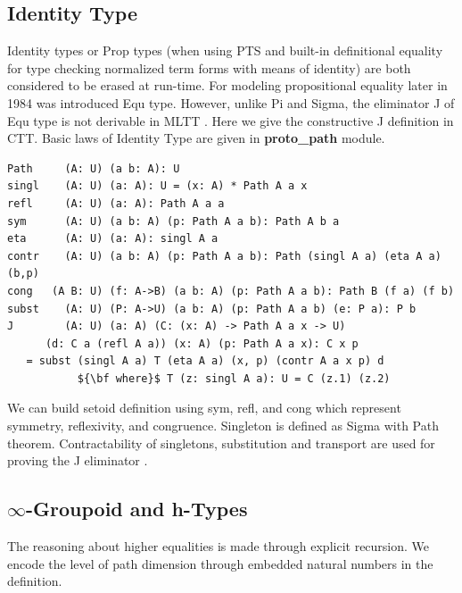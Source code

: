 \documentclass{article}
\begin{document}


\subsection{Identity Type}

Identity types or Prop types (when using PTS and built-in definitional equality for type checking
normalized term forms with means of identity) are both considered to be erased at run-time.
For modeling propositional equality later in 1984 was introduced Equ type. \cite{Lof84}
However, unlike Pi and Sigma, the eliminator J of Equ type is
not derivable in MLTT \cite{Hofmann96, Mortberg17, HoTT}.
Here we give the constructive J definition in CTT. Basic laws of Identity Type
are given in {\bf proto\_path} module.

\begin{lstlisting}[mathescape=true]
Path     (A: U) (a b: A): U
singl    (A: U) (a: A): U = (x: A) * Path A a x
refl     (A: U) (a: A): Path A a a
sym      (A: U) (a b: A) (p: Path A a b): Path A b a
eta      (A: U) (a: A): singl A a
contr    (A: U) (a b: A) (p: Path A a b): Path (singl A a) (eta A a) (b,p)
cong   (A B: U) (f: A->B) (a b: A) (p: Path A a b): Path B (f a) (f b)
subst    (A: U) (P: A->U) (a b: A) (p: Path A a b) (e: P a): P b
J        (A: U) (a: A) (C: (x: A) -> Path A a x -> U)
      (d: C a (refl A a)) (x: A) (p: Path A a x): C x p
   = subst (singl A a) T (eta A a) (x, p) (contr A a x p) d
           ${\bf where}$ T (z: singl A a): U = C (z.1) (z.2)
\end{lstlisting}

We can build setoid \cite{Bishop67} definition using sym, refl, and cong which
represent symmetry, reflexivity, and congruence.
Singleton is defined as Sigma with Path theorem. Contractability of singletons,
substitution and transport are used for proving the J eliminator \cite{HoTT}.

\subsection{$\infty$-Groupoid and h-Types}

The reasoning about higher equalities is made through explicit recursion.
We encode the level of path dimension through embedded natural numbers in the definition.
\end{document}
